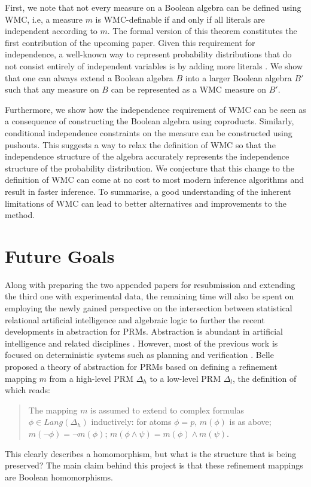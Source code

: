\documentclass{article}
\begin{document}
First, we note that not every measure on a Boolean algebra can be defined using
WMC, i.e, a measure $m$ is WMC-definable if and only if all literals are
independent according to $m$. The formal version of this theorem constitutes the
first contribution of the upcoming paper. Given this requirement for
independence, a well-known way to represent probability distributions that do
not consist entirely of independent variables is by adding more literals
\cite{DBLP:journals/ai/ChaviraD08}. We show that one can always extend a Boolean
algebra $B$ into a larger Boolean algebra $B'$ such that any measure on $B$ can
be represented as a WMC measure on $B'$.

Furthermore, we show how the independence requirement of WMC can be seen as a
consequence of constructing the Boolean algebra using coproducts. Similarly,
conditional independence constraints on the measure can be constructed using
pushouts. This suggests a way to relax the definition of WMC so that the
independence structure of the algebra accurately represents the independence
structure of the probability distribution. We conjecture that this change to the
definition of WMC can come at no cost to most modern inference algorithms and
result in faster inference. To summarise, a good understanding of the inherent
limitations of WMC can lead to better alternatives and improvements to the
method.

\section{Future Goals}

Along with preparing the two appended papers for resubmission and extending the
third one with experimental data, the remaining time will also be spent on
employing the newly gained perspective on the intersection between statistical
relational artificial intelligence and algebraic logic to further the recent
developments in abstraction for PRMs. Abstraction is abundant in artificial
intelligence and related disciplines \cite{saitta2013abstraction}. However, most
of the previous work is focused on deterministic systems such as planning and
verification \cite{DBLP:journals/ai/GiunchigliaW92}. Belle
\cite{DBLP:journals/corr/abs-1810-02434} proposed a theory of abstraction for
PRMs based on defining a refinement mapping $m$ from a high-level PRM $\Delta_h$
to a low-level PRM $\Delta_l$, the definition of which reads:
\begin{quote}
  The mapping $m$ is assumed to extend to complex formulas $\phi \in
  \mathit{Lang}(\Delta_h)$ inductively: for atoms $\phi = p$, $m(\phi)$ is as
  above; $m(\neg\phi) = \neg m(\phi)$; $m(\phi \land \psi) = m(\phi) \land
  m(\psi)$.
\end{quote}
This clearly describes a homomorphism, but what is the structure that is being
preserved? The main claim behind this project is that these refinement mappings
are Boolean homomorphisms.
\end{document}
